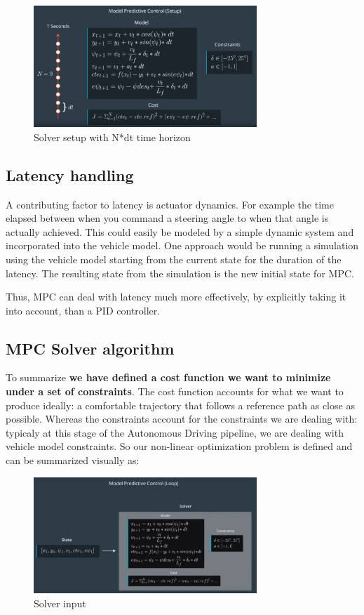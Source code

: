 \documentclass[11pt]{article}
\begin{document}
\begin{figure}[h]
    \centering
    \includegraphics[width=0.75\textwidth]{solver_setup}
    \caption{Solver setup with N*dt time horizon}
    \label{fig:solver_setup}
\end{figure}

\subsection{Latency handling}


A contributing factor to latency is actuator dynamics. For example the time elapsed between when you command a steering angle to when that angle is actually achieved. This could easily be modeled by a simple dynamic system and incorporated into the vehicle model. One approach would be running a simulation using the vehicle model starting from the current state for the duration of the latency. The resulting state from the simulation is the new initial state for MPC.

Thus, MPC can deal with latency much more effectively, by explicitly taking it into account, than a PID controller.

\subsection{MPC Solver algorithm}

To summarize \textbf{we have defined a cost function we want to minimize under a set of constraints}. The cost function accounts for what we want to produce ideally: a comfortable trajectory that follows a reference path as close as possible. Whereas the constraints account for the constraints we are dealing with: typicaly at this stage of the Autonomous Driving pipeline, we are dealing with vehicle model constraints. So our non-linear optimization problem is defined and can be summarized visually as:

\begin{figure}[h]
    \centering
    \includegraphics[width=0.75\textwidth]{solver_in}
    \caption{Solver input}
    \label{fig:solver_in}
\end{figure}
\end{document}
